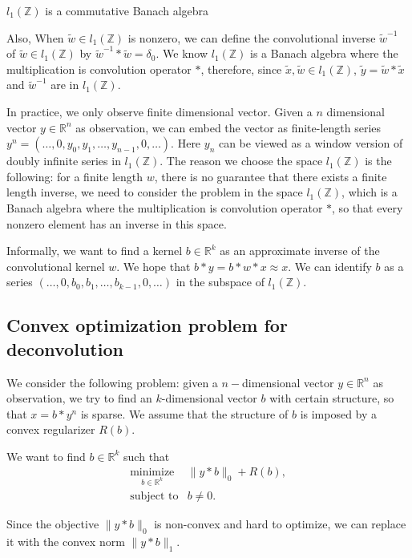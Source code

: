 \documentclass[letter, 10pt]{article}
\numberwithin{equation}{section}
\begin{document}
$l_1( \mathbb{Z})$ is a commutative Banach algebra

Also, 
When $\tilde w \in l_1( \mathbb{Z})$ is nonzero, we can define the convolutional inverse $\tilde w^{-1}$ of $\tilde w\in l_1( \mathbb{Z})$ by $\tilde w^{-1}*\tilde w = \delta_0$.
 We know $l_1( \mathbb{Z})$ is a Banach algebra where the multiplication is convolution operator $*$, therefore, since $\tilde x,\tilde w\in l_1( \mathbb{Z})$, $\tilde y=\tilde w*\tilde x$ and $\tilde w^{-1}$ are in $l_1( \mathbb{Z})$.
  
In practice, we only observe finite dimensional vector. Given a $n$ dimensional vector $ y\in \mathbb{R}^n$ as observation, we can embed the vector as finite-length series $y^n = (\ldots, 0, y_0, y_1, \ldots, y_{n-1}, 0, \ldots)$. Here $y_n$ can be viewed as a window version of doubly infinite series in $ l_1( \mathbb{Z})$.  The reason we choose the space $l_1( \mathbb{Z})$ is the following: for a finite length $w$, there is no guarantee that there exists a finite length inverse, we need to consider the problem in the space $l_1( \mathbb{Z})$, which is a Banach algebra where the multiplication is convolution operator $*$, so that every nonzero element has an inverse in this space. 

Informally, we want to find a kernel $b\in \mathbb{R}^k$ as an approximate inverse of the convolutional kernel $w$. We hope that $b*y = b*w*x \approx x$. We can identify $b$ as a series $(\ldots, 0, b_0, b_1, \ldots, b_{k-1}, 0, \ldots)$ in the subspace of $ l_1(\mathbb{Z})$. 

\subsection{Convex optimization problem for deconvolution}
We consider the following problem: given a $n-$dimensional vector $ y\in \mathbb{R}^n$ as observation, we try to find an $k$-dimensional vector $b$ with certain structure, so that $x = b*y^n$ is sparse. We assume that the structure of $b$ is imposed by a convex regularizer $R(b)$.

We want to find $b \in \mathbb{R}^k$ such that 
 \begin{eqnarray*}
\underset{b\in \mathbb{R}^k}{\mbox{minimize}}& \|y*b\|_0+R(b) ,\\
\mbox{subject to}& b \neq 0.
 \end{eqnarray*}

Since the objective $\|y*b\|_0$ is non-convex and hard to optimize, we can replace it with the convex norm $\|y*b\|_1$. 
\end{document}
